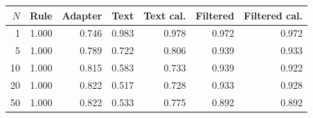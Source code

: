 \begin{tabular}{rrrrrrr}
\toprule
$N$ & Rule & Adapter & Text & Text cal. & Filtered & Filtered cal. \\
\midrule
1 & 1.000 & 0.746 & 0.983 & 0.978 & 0.972 & 0.972 \\
5 & 1.000 & 0.789 & 0.722 & 0.806 & 0.939 & 0.933 \\
10 & 1.000 & 0.815 & 0.583 & 0.733 & 0.939 & 0.922 \\
20 & 1.000 & 0.822 & 0.517 & 0.728 & 0.933 & 0.928 \\
50 & 1.000 & 0.822 & 0.533 & 0.775 & 0.892 & 0.892 \\
\bottomrule
\end{tabular}
